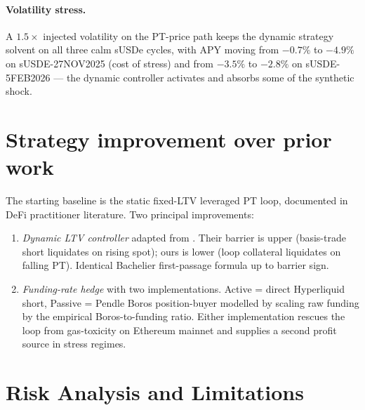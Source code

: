 \documentclass[11pt,a4paper]{article}
\begin{document}
\paragraph{Volatility stress.} A \(1.5\times\) injected
volatility on the PT-price path keeps the dynamic strategy
solvent on all three calm sUSDe cycles, with APY moving from
\(-0.7\%\) to \(-4.9\%\) on sUSDE-27NOV2025 (cost of stress)
and from \(-3.5\%\) to \(-2.8\%\) on sUSDE-5FEB2026 — the
dynamic controller activates and absorbs some of the synthetic
shock.

\section{Strategy improvement over prior work}

The starting baseline is the static fixed-LTV leveraged PT loop,
documented in DeFi practitioner literature. Two principal
improvements:

\begin{enumerate}[topsep=2pt,itemsep=2pt]
  \item \emph{Dynamic LTV controller} adapted from
        \cite{krestenko2026}. Their barrier is upper
        (basis-trade short liquidates on rising spot); ours is
        lower (loop collateral liquidates on falling PT).
        Identical Bachelier first-passage formula up to barrier
        sign.

  \item \emph{Funding-rate hedge} with two implementations.
        Active = direct Hyperliquid short, Passive = Pendle Boros
        position-buyer modelled by scaling raw funding by the
        empirical Boros-to-funding ratio. Either implementation
        rescues the loop from gas-toxicity on Ethereum mainnet
        and supplies a second profit source in stress regimes.
\end{enumerate}

\section{Risk Analysis and Limitations}
\label{sec:risk}
\end{document}
